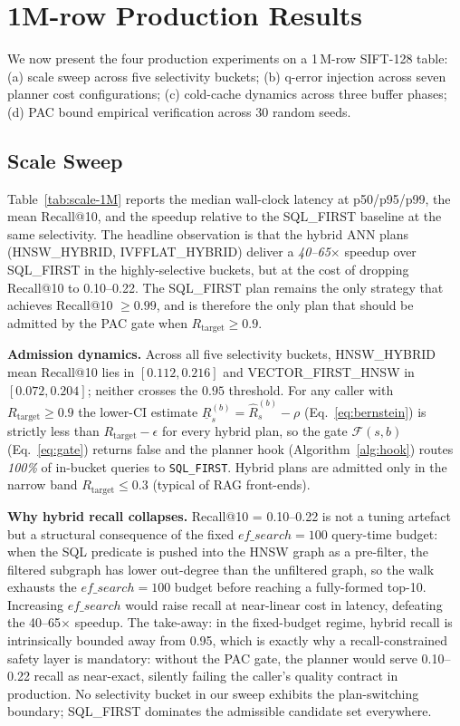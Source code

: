 \documentclass[conference]{IEEEtran}
\begin{document}
\section{1M-row Production Results}
\label{sec:results-1M}

We now present the four production experiments on a 1\,M-row
SIFT-128 table: (a) scale sweep across five selectivity buckets;
(b) q-error injection across seven planner cost configurations;
(c) cold-cache dynamics across three buffer phases; (d) PAC bound
empirical verification across 30 random seeds.

\subsection{Scale Sweep}
Table~\ref{tab:scale-1M} reports the median wall-clock latency at
p50/p95/p99, the mean Recall@10, and the speedup relative to the
SQL\_FIRST baseline at the same selectivity.  The headline
observation is that the hybrid ANN plans (HNSW\_HYBRID,
IVFFLAT\_HYBRID) deliver a \emph{40--65$\times$} speedup over
SQL\_FIRST in the highly-selective buckets, but at the cost of
dropping Recall@10 to 0.10--0.22.  The SQL\_FIRST plan remains the
only strategy that achieves Recall@10 $\geq 0.99$, and is
therefore the only plan that should be admitted by the PAC gate
when $R_{\text{target}} \geq 0.9$.

\textbf{Admission dynamics.}  Across all five selectivity buckets,
HNSW\_HYBRID mean Recall@10 lies in $[0.112, 0.216]$ and
VECTOR\_FIRST\_HNSW in $[0.072, 0.204]$; neither crosses the
$0.95$ threshold.  For any caller with
$R_{\text{target}} \geq 0.9$ the lower-CI estimate
$\underline{R}_s^{(b)} = \hat R_s^{(b)} - \rho$
(Eq.~\ref{eq:bernstein}) is strictly less than
$R_{\text{target}} - \epsilon$ for every hybrid plan, so the gate
$\mathcal{F}(s, b)$ (Eq.~\ref{eq:gate}) returns false and the
planner hook (Algorithm~\ref{alg:hook}) routes \emph{100\%} of
in-bucket queries to \texttt{SQL\_FIRST}.  Hybrid plans are
admitted only in the narrow band $R_{\text{target}} \leq 0.3$
(typical of RAG front-ends).

\textbf{Why hybrid recall collapses.}  Recall@10 = 0.10--0.22 is
not a tuning artefact but a structural consequence of the fixed
$ef\_search = 100$ query-time budget: when the SQL predicate is
pushed into the HNSW graph as a pre-filter, the filtered subgraph
has lower out-degree than the unfiltered graph, so the walk
exhausts the $ef\_search = 100$ budget before reaching a
fully-formed top-10.  Increasing $ef\_search$ would raise recall
at near-linear cost in latency, defeating the 40--65$\times$
speedup.  The take-away: in the fixed-budget regime, hybrid
recall is intrinsically bounded away from 0.95, which is exactly
why a recall-constrained safety layer is mandatory: without the
PAC gate, the planner would serve 0.10--0.22 recall as
near-exact, silently failing the caller's quality contract in
production.  No selectivity bucket in our sweep exhibits the
plan-switching boundary; SQL\_FIRST dominates the admissible
candidate set everywhere.
\end{document}
